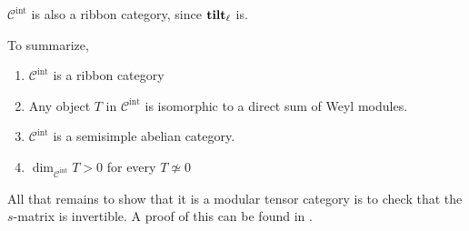 $\mathcal{C}^\text{int}$ is also a ribbon category, since $\mathbf{tilt}_\ell$ is.

To summarize, 
\begin{prop}
\begin{enumerate}
    \item  $\mathcal{C}^\text{int}$ is a ribbon category
    \item Any object $T$ in $\mathcal{C}^\text{int}$ is isomorphic to a direct sum of Weyl modules.
    \item $\mathcal{C}^\text{int}$ is a semisimple abelian category. 
    \item $\dim_{\mathcal{C}^\text{int}} T > 0$ for every $T \not\simeq 0$
\end{enumerate}
\end{prop}

All that remains to show that it is a modular tensor category is to check that
the $s$-matrix is invertible. A proof of this can be found in \cite{Kirillov}.
